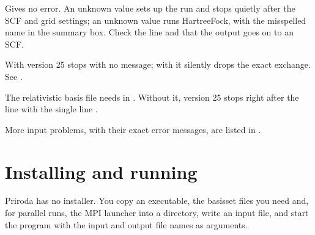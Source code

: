 \documentclass[letterpaper,10pt,english,openany,oneside]{sphinxmanual}
\begin{document}
\begin{description}
\sphinxAtStartPar
Gives no error. An unknown  value sets up the run and stops quietly after the SCF and grid settings; an
unknown  value runs Hartree\textendash{}Fock, with the misspelled name in the summary box. Check the
 line and that the output goes on to an SCF.



\sphinxAtStartPar
With  version 25 stops with no message; with  it silently drops the exact exchange. See
{\hyperref[\detokenize{troubleshooting/common-problems:troubleshooting-hybrid}]{}}.



\sphinxAtStartPar
The relativistic basis file needs  in . Without it, version 25 stops right after the line
 with the single line .



\end{description}

\sphinxAtStartPar
More input problems, with their exact error messages, are listed in {\hyperref[\detokenize{troubleshooting/common-problems:troubleshooting-input}]{}}.

\sphinxstepscope


\chapter{Installing and running}
\label{\detokenize{start/running:installing-and-running}}\label{\detokenize{start/running::doc}}
\sphinxAtStartPar
Priroda has no installer. You copy an executable, the basis\sphinxhyphen{}set files you need and, for parallel runs, the MPI
launcher into a directory, write an input file, and start the program with the input and output file names as
arguments.
\end{document}
